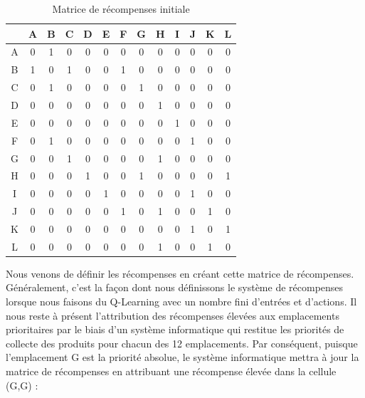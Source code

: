\documentclass{article}
\begin{document}
\begin{table}[H]
    \centering
    \begin{tabular}{|c|c|c|c|c|c|c|c|c|c|c|c|c|}
        \hline
        & A & B & C & D & E & F & G & H & I & J & K & L \\
        \hline
        A & 0 & 1 & 0 & 0 & 0 & 0 & 0 & 0 & 0 & 0 & 0 & 0 \\
	\hline
        B & 1 & 0 & 1 & 0 & 0 & 1 & 0 & 0 & 0 & 0 & 0 & 0 \\
	\hline
        C & 0 & 1 & 0 & 0 & 0 & 0 & 1 & 0 & 0 & 0 & 0 & 0 \\
	\hline
        D & 0 & 0 & 0 & 0 & 0 & 0 & 0 & 1 & 0 & 0 & 0 & 0 \\
	\hline
        E & 0 & 0 & 0 & 0 & 0 & 0 & 0 & 0 & 1 & 0 & 0 & 0 \\
	\hline
        F & 0 & 1 & 0 & 0 & 0 & 0 & 0 & 0 & 0 & 1 & 0 & 0 \\
	\hline
        G & 0 & 0 & 1 & 0 & 0 & 0 & 0 & 1 & 0 & 0 & 0 & 0 \\
	\hline
        H & 0 & 0 & 0 & 1 & 0 & 0 & 1 & 0 & 0 & 0 & 0 & 1 \\
	\hline
        I & 0 & 0 & 0 & 0 & 1 & 0 & 0 & 0 & 0 & 1 & 0 & 0 \\
	\hline
        J & 0 & 0 & 0 & 0 & 0 & 1 & 0 & 1 & 0 & 0 & 1 & 0 \\
	\hline
        K & 0 & 0 & 0 & 0 & 0 & 0 & 0 & 0 & 0 & 1 & 0 & 1 \\
	\hline
        L & 0 & 0 & 0 & 0 & 0 & 0 & 0 & 1 & 0 & 0 & 1 & 0 \\
        \hline
    \end{tabular}
    \caption{Matrice de récompenses initiale}
\end{table}
Nous venons de définir les récompenses en créant cette matrice de récompenses. Généralement, c'est la façon dont nous définissons le système de récompenses lorsque nous faisons du Q-Learning avec un nombre fini d'entrées et d'actions. Il nous reste à présent l'attribution des récompenses élevées aux emplacements prioritaires par le biais d'un système informatique qui restitue les priorités de collecte des produits pour chacun des 12 emplacements. Par conséquent, puisque l'emplacement G est la priorité absolue, le système informatique mettra à jour la matrice de récompenses en attribuant une récompense élevée dans la cellule (G,G) :
\end{document}
